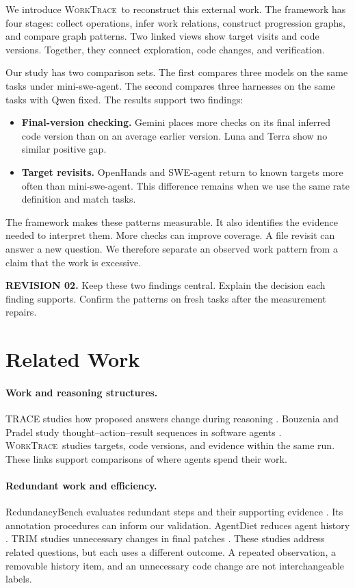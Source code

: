 \documentclass[10pt,a4paper,twocolumn]{article}
\newcommand{\rev}[2]{\par\smallskip\noindent\begin{minipage}{\linewidth}\color{revision}\footnotesize\textbf{REVISION #1.} #2\end{minipage}\par\smallskip}
\newcommand{\wt}{\textsc{WorkTrace}}
\begin{document}
We introduce \wt\ to reconstruct this external work. The framework has four stages: collect operations, infer work relations, construct progression graphs, and compare graph patterns. Two linked views show target visits and code versions. Together, they connect exploration, code changes, and verification.

Our study has two comparison sets. The first compares three models on the same tasks under mini-swe-agent. The second compares three harnesses on the same tasks with Qwen fixed. The results support two findings:
\begin{itemize}
\setlength{\itemsep}{2pt}\setlength{\topsep}{3pt}
\item \textbf{Final-version checking.} Gemini places more checks on its final inferred code version than on an average earlier version. Luna and Terra show no similar positive gap.
\item \textbf{Target revisits.} OpenHands and SWE-agent return to known targets more often than mini-swe-agent. This difference remains when we use the same rate definition and match tasks.
\end{itemize}
The framework makes these patterns measurable. It also identifies the evidence needed to interpret them. More checks can improve coverage. A file revisit can answer a new question. We therefore separate an observed work pattern from a claim that the work is excessive.
\rev{02}{Keep these two findings central. Explain the decision each finding supports. Confirm the patterns on fresh tasks after the measurement repairs.}

\section{Related Work}
\paragraph{Work and reasoning structures.}
TRACE studies how proposed answers change during reasoning \citep{trace}. Bouzenia and Pradel study thought--action--result sequences in software agents \citep{bouzenia}. \wt\ studies targets, code versions, and evidence within the same run. These links support comparisons of where agents spend their work.
\paragraph{Redundant work and efficiency.}
RedundancyBench evaluates redundant steps and their supporting evidence \citep{redundancybench}. Its annotation procedures can inform our validation. AgentDiet reduces agent history \citep{agentdiet}. TRIM studies unnecessary changes in final patches \citep{trim}. These studies address related questions, but each uses a different outcome. A repeated observation, a removable history item, and an unnecessary code change are not interchangeable labels.
\end{document}
